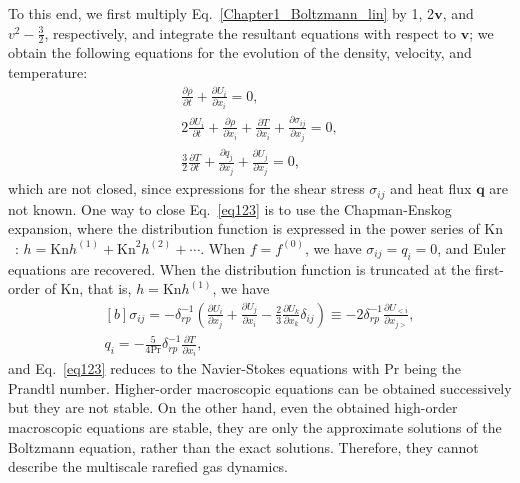 To this end, we first multiply Eq.~\eqref{Chapter1_Boltzmann_lin} by 1, 2$\bm{v}$, and $v^2-\frac{3}{2}$, respectively, and integrate the resultant equations with respect to $\bm{v}$; we obtain the following equations for the evolution of the density, velocity, and temperature: 
\begin{equation}\label{eq123}
\begin{aligned}
\frac{\partial {\rho}}{\partial{t}}+\frac{\partial {U_i}}{\partial{x_i}}=0, \\
2\frac{\partial {U_i}}{\partial{t}}+\frac{\partial {\rho}}{\partial{x_i}}+\frac{\partial {T}}{\partial{x_i}}+\frac{\partial {{\sigma_{ij}}}}{\partial{x_j}}=0, \\
\frac{3}{2}\frac{\partial {T}}{\partial{t}}+\frac{\partial {{q_j}}}{\partial{x_j}}+\frac{\partial {U_j}}{\partial{x_j}}=0,
\end{aligned}
\end{equation}
which are not closed, since expressions for the shear stress $\sigma_{ij}$ and heat flux $\bm{q}$ are not known. One way to close Eq.~\eqref{eq123} is to use the Chapman-Enskog expansion, where the distribution function is expressed in the power series of $\mathrm{Kn}$~\citep{CE}: $h=\mathrm{Kn} h^{(1)}+\mathrm{Kn}^2 h^{(2)}+\cdots$. When $f=f^{(0)}$, we have $\sigma_{ij}= q_i=0$, and Euler equations are recovered. When the distribution function is truncated at the first-order of $\mathrm{Kn}$, that is, $
h=\mathrm{Kn} h^{(1)}$,
we have 
\begin{equation}\label{GTMNSF}
\begin{aligned}[b]
\sigma_{ij} =-\delta_{rp}^{-1}\left(\frac{\partial U_{i}}{\partial x_{j}}+\frac{\partial U_{j}}{\partial x_{i}}-\frac{2}{3}\frac{\partial U_{k}}{\partial x_{k}}\delta_{ij}\right)\equiv-2\delta_{rp}^{-1}\frac{\partial U_{<i}}{\partial {x_{j>}}}, \\
q_i = -\frac{5}{4\mathrm{Pr}}\delta_{rp}^{-1} \frac{\partial T}{\partial x_i},
\end{aligned}
\end{equation}
and Eq.~\eqref{eq123} reduces to the Navier-Stokes equations with $\mathrm{Pr}$ being the Prandtl number. Higher-order macroscopic equations can be obtained successively but they are not stable. On the other hand, even the obtained high-order macroscopic equations are stable, they are only the approximate solutions of the Boltzmann equation, rather than the exact solutions. Therefore, they cannot describe the multiscale rarefied gas dynamics.


